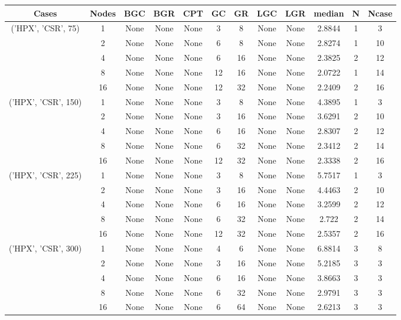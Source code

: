 \begin{tabular}{cccccccccccc}
\hline
Cases & Nodes& BGC& BGR& CPT& GC& GR& LGC& LGR& median & N & Ncase \\
\hline
\multirow{5}{*}{('HPX', 'CSR', 75)}& 1& None& None& None& 3& 8& None& None& 2.8844& 1& 3\\
& 2& None& None& None& 6& 8& None& None& 2.8274& 1& 10\\
& 4& None& None& None& 6& 16& None& None& 2.3825& 2& 12\\
& 8& None& None& None& 12& 16& None& None& 2.0722& 1& 14\\
& 16& None& None& None& 12& 32& None& None& 2.2409& 2& 16\\
\hline
\multirow{5}{*}{('HPX', 'CSR', 150)}& 1& None& None& None& 3& 8& None& None& 4.3895& 1& 3\\
& 2& None& None& None& 3& 16& None& None& 3.6291& 2& 10\\
& 4& None& None& None& 6& 16& None& None& 2.8307& 2& 12\\
& 8& None& None& None& 6& 32& None& None& 2.3412& 2& 14\\
& 16& None& None& None& 12& 32& None& None& 2.3338& 2& 16\\
\hline
\multirow{5}{*}{('HPX', 'CSR', 225)}& 1& None& None& None& 3& 8& None& None& 5.7517& 1& 3\\
& 2& None& None& None& 3& 16& None& None& 4.4463& 2& 10\\
& 4& None& None& None& 6& 16& None& None& 3.2599& 2& 12\\
& 8& None& None& None& 6& 32& None& None& 2.722& 2& 14\\
& 16& None& None& None& 12& 32& None& None& 2.5357& 2& 16\\
\hline
\multirow{5}{*}{('HPX', 'CSR', 300)}& 1& None& None& None& 4& 6& None& None& 6.8814& 3& 8\\
& 2& None& None& None& 3& 16& None& None& 5.2185& 3& 3\\
& 4& None& None& None& 6& 16& None& None& 3.8663& 3& 3\\
& 8& None& None& None& 6& 32& None& None& 2.9791& 3& 3\\
& 16& None& None& None& 6& 64& None& None& 2.6213& 3& 3\\
\hline
\end{tabular}
